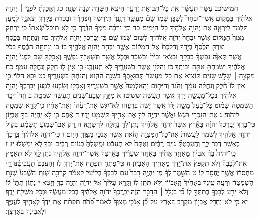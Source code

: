 \documentclass[twoside, openany, parskip=half, 11pt]{book}
\begin{document}
חמישיכב עַשֵּׂ֣ר תְּעַשֵּׂ֔ר אֵ֖ת כׇּל־תְּבוּאַ֣ת זַרְעֶ֑ךָ הַיֹּצֵ֥א הַשָּׂדֶ֖ה שָׁנָ֥ה שָׁנָֽה׃ כג וְאָכַלְתָּ֞ לִפְנֵ֣י ׀ יְהֹוָ֣ה אֱלֹהֶ֗יךָ בַּמָּק֣וֹם אֲשֶׁר־יִבְחַר֮ לְשַׁכֵּ֣ן שְׁמ֣וֹ שָׁם֒ מַעְשַׂ֤ר דְּגָֽנְךָ֙ תִּירֹֽשְׁךָ֣ וְיִצְהָרֶ֔ךָ וּבְכֹרֹ֥ת בְּקָרְךָ֖ וְצֹאנֶ֑ךָ לְמַ֣עַן תִּלְמַ֗ד לְיִרְאָ֛ה אֶת־יְהֹוָ֥ה אֱלֹהֶ֖יךָ כׇּל־הַיָּמִֽים׃ כד וְכִֽי־יִרְבֶּ֨ה מִמְּךָ֜ הַדֶּ֗רֶךְ כִּ֣י לֹ֣א תוּכַל֮ שְׂאֵתוֹ֒ כִּֽי־יִרְחַ֤ק מִמְּךָ֙ הַמָּק֔וֹם אֲשֶׁ֤ר יִבְחַר֙ יְהֹוָ֣ה אֱלֹהֶ֔יךָ לָשׂ֥וּם שְׁמ֖וֹ שָׁ֑ם כִּ֥י יְבָרֶכְךָ֖ יְהֹוָ֥ה אֱלֹהֶֽיךָ׃ כה וְנָתַתָּ֖ה בַּכָּ֑סֶף וְצַרְתָּ֤ הַכֶּ֙סֶף֙ בְּיָ֣דְךָ֔ וְהָֽלַכְתָּ֙ אֶל־הַמָּק֔וֹם אֲשֶׁ֥ר יִבְחַ֛ר יְהֹוָ֥ה אֱלֹהֶ֖יךָ בּֽוֹ׃ כו וְנָתַתָּ֣ה הַכֶּ֡סֶף בְּכֹל֩ אֲשֶׁר־תְּאַוֶּ֨ה נַפְשְׁךָ֜ בַּבָּקָ֣ר וּבַצֹּ֗אן וּבַיַּ֙יִן֙ וּבַשֵּׁכָ֔ר וּבְכֹ֛ל אֲשֶׁ֥ר תִּֽשְׁאָלְךָ֖ נַפְשֶׁ֑ךָ וְאָכַ֣לְתָּ שָּׁ֗ם לִפְנֵי֙ יְהֹוָ֣ה אֱלֹהֶ֔יךָ וְשָׂמַחְתָּ֖ אַתָּ֥ה וּבֵיתֶֽךָ׃ כז וְהַלֵּוִ֥י אֲשֶׁר־בִּשְׁעָרֶ֖יךָ לֹ֣א תַֽעַזְבֶ֑נּוּ כִּ֣י אֵ֥ין ל֛וֹ חֵ֥לֶק וְנַחֲלָ֖ה עִמָּֽךְ׃
כח מִקְצֵ֣ה ׀ שָׁלֹ֣שׁ שָׁנִ֗ים תּוֹצִיא֙ אֶת־כׇּל־מַעְשַׂר֙ תְּבוּאָ֣תְךָ֔ בַּשָּׁנָ֖ה הַהִ֑וא וְהִנַּחְתָּ֖ בִּשְׁעָרֶֽיךָ׃ כט וּבָ֣א הַלֵּוִ֡י כִּ֣י אֵֽין־לוֹ֩ חֵ֨לֶק וְנַחֲלָ֜ה עִמָּ֗ךְ וְ֠הַגֵּ֠ר וְהַיָּת֤וֹם וְהָֽאַלְמָנָה֙ אֲשֶׁ֣ר בִּשְׁעָרֶ֔יךָ וְאָכְל֖וּ וְשָׂבֵ֑עוּ לְמַ֤עַן יְבָרֶכְךָ֙ יְהֹוָ֣ה אֱלֹהֶ֔יךָ בְּכׇל־מַעֲשֵׂ֥ה יָדְךָ֖ אֲשֶׁ֥ר תַּעֲשֶֽׂה׃
ששיטו א מִקֵּ֥ץ שֶֽׁבַע־שָׁנִ֖ים תַּעֲשֶׂ֥ה שְׁמִטָּֽה׃ ב וְזֶה֮ דְּבַ֣ר הַשְּׁמִטָּה֒ שָׁמ֗וֹט כׇּל־בַּ֙עַל֙ מַשֵּׁ֣ה יָד֔וֹ אֲשֶׁ֥ר יַשֶּׁ֖ה בְּרֵעֵ֑הוּ לֹֽא־יִגֹּ֤שׂ אֶת־רֵעֵ֙הוּ֙ וְאֶת־אָחִ֔יו כִּֽי־קָרָ֥א שְׁמִטָּ֖ה לַיהֹוָה׃ ג אֶת־הַנׇּכְרִ֖י תִּגֹּ֑שׂ וַאֲשֶׁ֨ר יִהְיֶ֥ה לְךָ֛ אֶת־אָחִ֖יךָ תַּשְׁמֵ֥ט יָדֶֽךָ׃ ד אֶ֕פֶס כִּ֛י לֹ֥א יִֽהְיֶה־בְּךָ֖ אֶבְי֑וֹן כִּֽי־בָרֵ֤ךְ יְבָֽרֶכְךָ֙ יְהֹוָ֔ה בָּאָ֕רֶץ אֲשֶׁר֙ יְהֹוָ֣ה אֱלֹהֶ֔יךָ נֹֽתֵן־לְךָ֥ נַחֲלָ֖ה לְרִשְׁתָּֽהּ׃ ה רַ֚ק אִם־שָׁמ֣וֹעַ תִּשְׁמַ֔ע בְּק֖וֹל יְהֹוָ֣ה אֱלֹהֶ֑יךָ לִשְׁמֹ֤ר לַעֲשׂוֹת֙ אֶת־כׇּל־הַמִּצְוָ֣ה הַזֹּ֔את אֲשֶׁ֛ר אָנֹכִ֥י מְצַוְּךָ֖ הַיּֽוֹם׃ ו כִּֽי־יְהֹוָ֤ה אֱלֹהֶ֙יךָ֙ בֵּֽרַכְךָ֔ כַּאֲשֶׁ֖ר דִּבֶּר־לָ֑ךְ וְהַֽעֲבַטְתָּ֞ גּוֹיִ֣ם רַבִּ֗ים וְאַתָּה֙ לֹ֣א תַעֲבֹ֔ט וּמָֽשַׁלְתָּ֙ בְּגוֹיִ֣ם רַבִּ֔ים וּבְךָ֖ לֹ֥א יִמְשֹֽׁלוּ׃
יג ז כִּֽי־יִהְיֶה֩ בְךָ֨ אֶבְי֜וֹן מֵאַחַ֤ד אַחֶ֙יךָ֙ בְּאַחַ֣ד שְׁעָרֶ֔יךָ בְּאַ֨רְצְךָ֔ אֲשֶׁר־יְהֹוָ֥ה אֱלֹהֶ֖יךָ נֹתֵ֣ן לָ֑ךְ לֹ֧א תְאַמֵּ֣ץ אֶת־לְבָבְךָ֗ וְלֹ֤א תִקְפֹּץ֙ אֶת־יָ֣דְךָ֔ מֵאָחִ֖יךָ הָאֶבְיֽוֹן׃ ח כִּֽי־פָתֹ֧חַ תִּפְתַּ֛ח אֶת־יָדְךָ֖ ל֑וֹ וְהַעֲבֵט֙ תַּעֲבִיטֶ֔נּוּ דֵּ֚י מַחְסֹר֔וֹ אֲשֶׁ֥ר יֶחְסַ֖ר לֽוֹ׃ ט הִשָּׁ֣מֶר לְךָ֡ פֶּן־יִהְיֶ֣ה דָבָר֩ עִם־לְבָבְךָ֨ בְלִיַּ֜עַל לֵאמֹ֗ר קָֽרְבָ֣ה שְׁנַֽת־הַשֶּׁ֘בַע֮ שְׁנַ֣ת הַשְּׁמִטָּה֒ וְרָעָ֣ה עֵֽינְךָ֗ בְּאָחִ֙יךָ֙ הָֽאֶבְי֔וֹן וְלֹ֥א תִתֵּ֖ן ל֑וֹ וְקָרָ֤א עָלֶ֙יךָ֙ אֶל־יְהֹוָ֔ה וְהָיָ֥ה בְךָ֖ חֵֽטְא׃ י נָת֤וֹן תִּתֵּן֙ ל֔וֹ וְלֹא־יֵרַ֥ע לְבָבְךָ֖ בְּתִתְּךָ֣ ל֑וֹ כִּ֞י בִּגְלַ֣ל ׀ הַדָּבָ֣ר הַזֶּ֗ה יְבָרֶכְךָ֙ יְהֹוָ֣ה אֱלֹהֶ֔יךָ בְּכׇֽל־מַעֲשֶׂ֔ךָ וּבְכֹ֖ל מִשְׁלַ֥ח יָדֶֽךָ׃ יא כִּ֛י לֹא־יֶחְדַּ֥ל אֶבְי֖וֹן מִקֶּ֣רֶב הָאָ֑רֶץ עַל־כֵּ֞ן אָנֹכִ֤י מְצַוְּךָ֙ לֵאמֹ֔ר פָּ֠תֹ֠חַ תִּפְתַּ֨ח אֶת־יָדְךָ֜ לְאָחִ֧יךָ לַעֲנִיֶּ֛ךָ וּלְאֶבְיֹנְךָ֖ בְּאַרְצֶֽךָ׃
\end{document}

